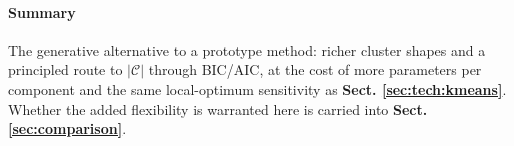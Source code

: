 \paragraph{Summary}
\label{sec:tech:gmm:summary}
The generative alternative to a prototype method: richer cluster shapes and a principled route to $|\mathcal C|$ through BIC/AIC, at the cost of more parameters per component and the same local-optimum sensitivity as \textbf{Sect. \ref{sec:tech:kmeans}}. Whether the added flexibility is warranted here is carried into \textbf{Sect. \ref{sec:comparison}}.

%
%
